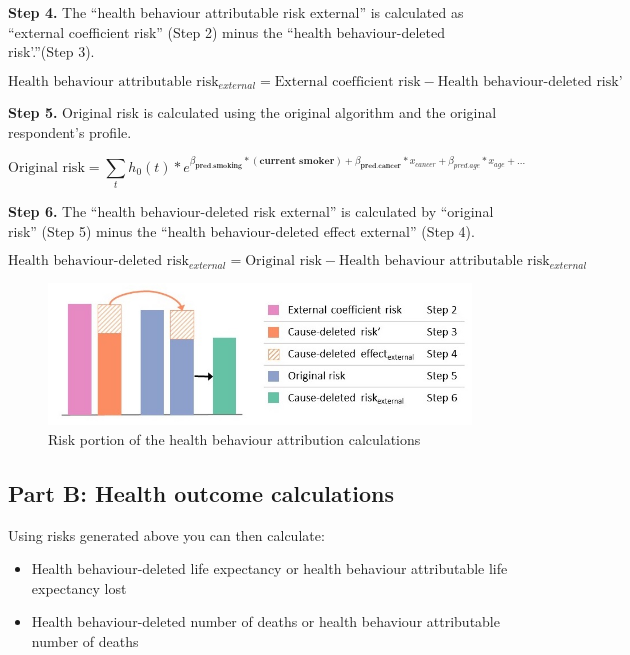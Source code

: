 \documentclass[]{book}
\providecommand{\tightlist}{%
  \setlength{\itemsep}{0pt}\setlength{\parskip}{0pt}}
\begin{document}
\textbf{Step 4.} The ``health behaviour attributable risk external'' is
calculated as ``external coefficient risk'' (Step 2) minus the ``health
behaviour-deleted risk'.''(Step 3).

\[\text{Health behaviour attributable risk}_{external} = \text{External coefficient risk} - \text{Health behaviour-deleted risk'}\]

\textbf{Step 5.} Original risk is calculated using the original
algorithm and the original respondent's profile.

\[ \text{Original risk} = \sum_t h_0(t) * e^{{\beta_\textbf{pred.smoking}}*{(\textbf{current smoker})}+{\beta_\textbf{pred.cancer}}*x_{cancer} + \beta_{pred.age}*x_{age} +...}  \]

\textbf{Step 6.} The ``health behaviour-deleted risk external'' is
calculated by ``original risk'' (Step 5) minus the ``health
behaviour-deleted effect external'' (Step 4).

\[\text{Health behaviour-deleted risk}_{ external} = \text{Original risk} - \text{Health behaviour attributable risk}_{external}\]

\begin{figure}

{\centering \includegraphics{Images/Method2 only -cbf} 

}

\caption{Risk portion of the health behaviour attribution calculations}\label{fig:unnamed-chunk-25}
\end{figure}

\subsection{Part B: Health outcome
calculations}\label{part-b-health-outcome-calculations}

Using risks generated above you can then calculate:

\begin{itemize}
\tightlist
\item
  Health behaviour-deleted life expectancy or health behaviour
  attributable life expectancy lost
\item
  Health behaviour-deleted number of deaths or health behaviour
  attributable number of deaths
\end{itemize}
\end{document}
